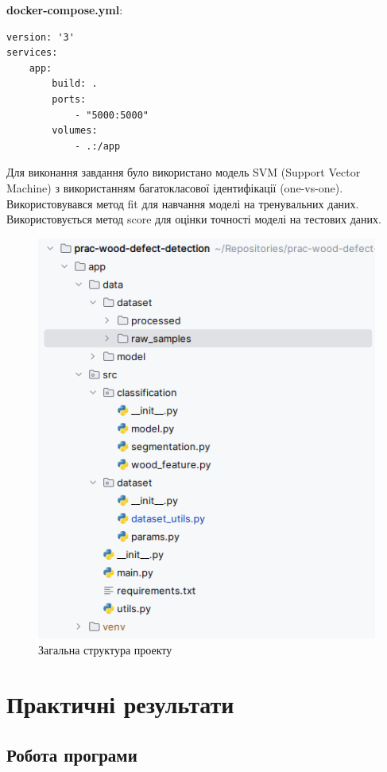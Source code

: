 \documentclass[oneside,14pt]{extarticle}
\begin{document}
\textbf{docker-compose.yml}:

\begin{lstlisting}
version: '3'
services:
	app:
		build: .
		ports:
			- "5000:5000"
		volumes:
			- .:/app
\end{lstlisting}

Для виконання завдання було використано модель SVM (Support Vector Machine) з використанням багатокласової ідентифікації (one-vs-one). Використовувався метод fit для навчання моделі на тренувальних даних. Використовується метод score для оцінки точності моделі на тестових даних.

\begin{figure}[H]
	\centering
	\includegraphics[scale=0.9]{1}
	\caption{Загальна структура проекту}
\end{figure}

\section{Практичні результати}

\subsection{Робота програми}
\end{document}
